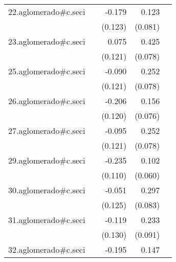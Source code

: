 {\begin{longtable}{l*{4}{D{.}{.}{-1}}}
\addlinespace
22.aglomerado#c.seci&                     &      -0.179         &       0.123         &                     \\
            &                     &     (0.123)         &     (0.081)         &                     \\
\addlinespace
23.aglomerado#c.seci&                     &       0.075         &       0.425\sym{***}&                     \\
            &                     &     (0.121)         &     (0.078)         &                     \\
\addlinespace
25.aglomerado#c.seci&                     &      -0.090         &       0.252\sym{**} &                     \\
            &                     &     (0.121)         &     (0.078)         &                     \\
\addlinespace
26.aglomerado#c.seci&                     &      -0.206         &       0.156\sym{*}  &                     \\
            &                     &     (0.120)         &     (0.076)         &                     \\
\addlinespace
27.aglomerado#c.seci&                     &      -0.095         &       0.252\sym{**} &                     \\
            &                     &     (0.121)         &     (0.078)         &                     \\
\addlinespace
29.aglomerado#c.seci&                     &      -0.235\sym{*}  &       0.102         &                     \\
            &                     &     (0.110)         &     (0.060)         &                     \\
\addlinespace
30.aglomerado#c.seci&                     &      -0.051         &       0.297\sym{***}&                     \\
            &                     &     (0.125)         &     (0.083)         &                     \\
\addlinespace
31.aglomerado#c.seci&                     &      -0.119         &       0.233\sym{*}  &                     \\
            &                     &     (0.130)         &     (0.091)         &                     \\
\addlinespace
32.aglomerado#c.seci&                     &      -0.195         &       0.147         &                     \\

\end{longtable}}
